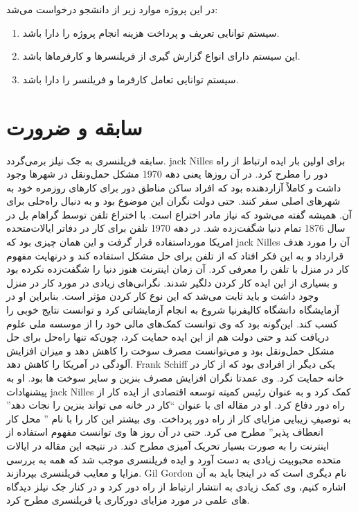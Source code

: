  در این پروژه موارد زیر از دانشجو درخواست می‌شد:
\begin{enumerate}
	\item
سیستم توانایی تعریف و پرداخت هزینه انجام پروژه را دارا باشد.
\item
این سیستم دارای انواع گزارش ‌گیری از فریلنسرها و کارفرماها باشد.
\item
سیستم توانایی تعامل کارفرما و فریلنسر را دارا باشد.
\end{enumerate}

\section{سابقه و ضرورت}
سابقه فریلنسری به جک نیلز برمی‌گردد. jack Nilles برای اولین بار ایده ارتباط از راه دور را مطرح کرد.
در آن روزها یعنی دهه 1970 مشکل حمل‌ونقل در شهرها وجود داشت و کاملاً آزاردهنده بود که افراد ساکن مناطق دور برای کارهای روزمره خود به شهرهای اصلی سفر کنند.
حتی دولت نگران این موضوع بود و به دنبال راه‌حلی برای آن. همیشه گفته می‌شود که نیاز مادر اختراع است.
با اختراع تلفن توسط گراهام بل در سال 1876 تمام دنیا شگفت‌زده شد. در دهه 1970 تلفن برای کار در دفاتر ایالات‌متحده امریکا مورداستفاده قرار گرفت و این همان چیزی بود که jack Nilles آن را مورد هدف قرارداد و به این فکر افتاد که از تلفن برای حل مشکل استفاده کند و درنهایت مفهوم کار در منزل با تلفن را معرفی کرد.
آن زمان اینترنت هنوز دنیا را شگفت‌زده نکرده بود و بسیاری از این ایده کار کردن دلگیر شدند.
نگرانی‌های زیادی در مورد کار در منزل وجود داشت و باید ثابت می‌شد که این نوع کار کردن مؤثر است.
بنابراین او در آزمایشگاه دانشگاه کالیفرنیا شروع به انجام آزمایشاتی کرد و توانست نتایج خوبی را کسب کند.
این‌گونه بود که وی توانست کمک‌های مالی خود را از موسسه ملی علوم دریافت کند و حتی دولت هم از این ایده حمایت کرد، چون‌که تنها راه‌حل برای حل مشکل حمل‌ونقل بود و می‌توانست مصرف سوخت را کاهش دهد و میزان افزایش آلودگی در آمریکا را کاهش دهد.
Frank Schiff یکی دیگر از افرادی بود که از کار در خانه حمایت کرد. وی عمدتا نگران افزایش مصرف بنزین و سایر سوخت ها بود. او به پیشنهادات jack Nilles کمک کرد و به عنوان رئیس کمیته توسعه اقتصادی از ایده کار از راه دور دفاع کرد. او در مقاله ای با عنوان “کار در خانه می تواند بنزین را نجات دهد” به توصیفِ زیبایی مزایای کار از راه دور پرداخت. وی بیشتر این کار را با نام ” محل کار انعطاف پذیر” مطرح می کرد. حتی در آن روز ها وی توانست مفهوم استفاده از اینترنت را به صورت بسیار تحریک آمیزی مطرح کند. در نتیجه این مقاله در ایالات متحده محبوبیت زیادی به دست آورد و ایده فریلنسری موجب شد که همه به بررسی مزایا و معایب فریلنسری بپردازند. Gil Gordon نام دیگری است که در اینجا باید به آن اشاره کنیم، وی کمک زیادی به انتشار ارتباط از راه دور کرد و در کنار جک نیلز دیدگاه های علمی در مورد مزایای دورکاری یا فریلنسری مطرح کرد.
